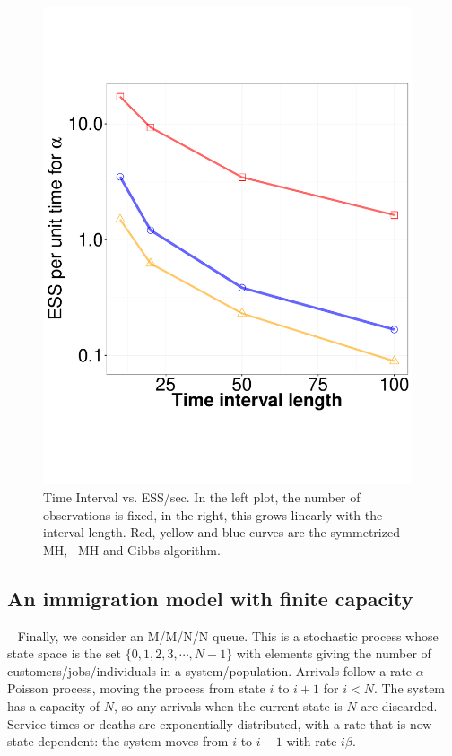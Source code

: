 {\begin{figure}
  \begin{minipage}[!hp]{0.45\linewidth}
  \centering
    \includegraphics [width=0.97\textwidth, angle=0]{figs/ESS_vs_t_alpha_fixobservation_JC.pdf}
  \end{minipage}
    \caption{Time Interval vs. ESS/sec. In the left plot, the number of 
    observations is fixed, in the right, this grows linearly with the
  interval length. Red, yellow and blue curves are the symmetrized MH,
  \naive\ MH and Gibbs algorithm. }
	\label{fig:jc_model_vs_t}
  \end{figure}


\subsection{An immigration model with finite capacity}\label{sec:immig}~
Finally, we consider an M/M/N/N queue. This is a stochastic 
process whose state space is the set $\{0, 1, 2, 3, \cdots, N - 1\}$ with 
elements giving the number of customers/jobs/individuals in a system/population. 
Arrivals follow a rate-$\alpha$ Poisson process, moving the process from state 
$i$ to $i+1$ for $i<N$. The system has a capacity of $N$, so any arrivals when 
the current state is $N$ are discarded.  Service times or deaths are 
exponentially distributed, with a rate that is now state-dependent:
the system moves from $i$ to $i - 1$ with rate $i\beta$. 

}
